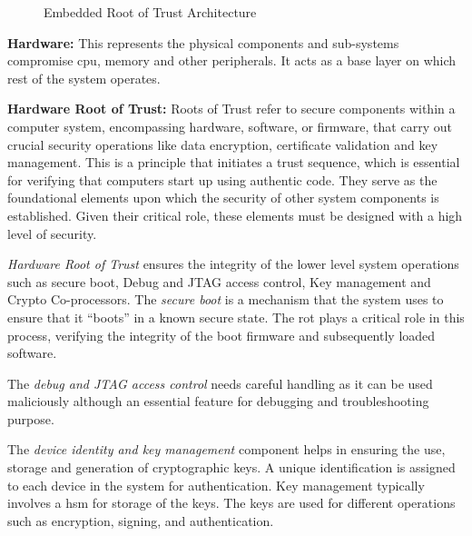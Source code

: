 \begin{figure}[h]
        \centering
        \caption{Embedded Root of Trust Architecture\cite{Introduc82:online}}\label{fig:rot}
\end{figure}

\textbf{Hardware:} This represents the physical components and sub-systems compromise
\gls{cpu}, memory\cite{WhatisCo30:online} and other peripherals. It acts as a base layer on which
rest of the system operates.

\textbf{Hardware Root of Trust:} Roots of Trust refer to secure components within a computer system,
encompassing hardware, software, or firmware\cite{WhatIsFi49:online}, that carry out crucial
security operations like data encryption, certificate validation and key management\cite{Hardware83:online}.
This is a principle that initiates a trust sequence, which is essential for verifying that
computers start up using authentic code. They serve as the foundational elements upon which the
security of other system components is established. Given their critical role, these elements must
be designed with a high level of
security\cite{WhatisRo39:online}\cite{Introduc7:online}\cite{RootofTr86:online}\cite{Hardware83:online}.

\textit{Hardware Root of Trust} ensures the integrity of the lower level system operations such as
secure boot\cite{zimmer2016establishing}, Debug and JTAG access control, Key management and Crypto Co-processors.
The \textit{secure boot} is a mechanism that the system uses to ensure that it ``boots'' in a known secure state.
The \acrshort{rot} plays a critical role in this process, verifying the integrity of the boot firmware and
subsequently loaded software\cite{Hardware83:online}\cite{zimmer2016establishing}.

The \textit{debug and JTAG access control} needs careful handling as it can be used maliciously although
an essential feature for debugging and troubleshooting purpose\cite{WhatisJT98:online}\cite{JTAGhard62:online}.

The \textit{device identity and key management} component helps in ensuring the use, storage
and generation of cryptographic keys. A unique identification is assigned to each device
in the system for authentication. Key management typically involves a \gls{hsm} for storage
of the keys\cite{WhatisKe81:online}. The keys are used for different operations such
as encryption\cite{WhatisEn13:online}, signing, and authentication\cite{needham1978using}.

